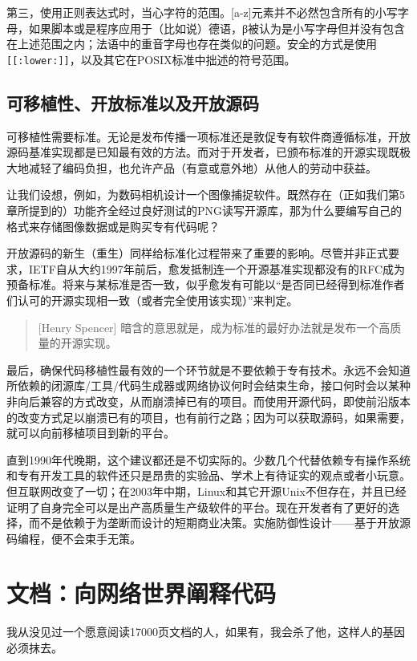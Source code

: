 \documentclass[12pt,oneside]{ctexbook}
\begin{document}
\begin{common-format}
第三，使用正则表达式时，当心字符的范围。[a-z]元素并不必然包含所有的小写字母，如果脚本或是程序应用于（比如说）德语，β被认为是小写字母但并没有包含在上述范围之内；法语中的重音字母也存在类似的问题。安全的方式是使用\verb+[[:lower:]]+，以及其它在POSIX标准中拙述的符号范围。

\section{可移植性、开放标准以及开放源码}
可移植性需要标准。无论是发布传播一项标准还是敦促专有软件商遵循标准，开放源码基准实现都是已知最有效的方法。而对于开发者，已颁布标准的开源实现既极大地减轻了编码负担，也允许产品（有意或意外地）从他人的劳动中获益。

让我们设想，例如，为数码相机设计一个图像捕捉软件。既然存在（正如我们第5章所提到的）功能齐全经过良好测试的PNG读写开源库，那为什么要编写自己的格式来存储图像数据或是购买专有代码呢？

开放源码的新生（重生）同样给标准化过程带来了重要的影响。尽管并非正式要求，IETF自从大约1997年前后，愈发抵制连一个开源基准实现都没有的RFC成为预备标准。将来与某标准是否一致，似乎愈发有可能以“是否同已经得到标准作者们认可的开源实现相一致（或者完全使用该实现）”来判定。

\begin{quote}[Henry Spencer]
暗含的意思就是，成为标准的最好办法就是发布一个高质量的开源实现。
\end{quote}

最后，确保代码移植性最有效的一个环节就是不要依赖于专有技术。永远不会知道所依赖的闭源库/工具/代码生成器或网络协议何时会结束生命，接口何时会以某种非向后兼容的方式改变，从而崩溃掉已有的项目。而使用开源代码，即使前沿版本的改变方式足以崩溃已有的项目，也有前行之路；因为可以获取源码，如果需要，就可以向前移植项目到新的平台。

直到1990年代晚期，这个建议都还是不切实际的。少数几个代替依赖专有操作系统和专有开发工具的软件还只是昂贵的实验品、学术上有待证实的观点或者小玩意。但互联网改变了一切；在2003年中期，Linux和其它开源Unix不但存在，并且已经证明了自身完全可以是出产高质量生产级软件的平台。现在开发者有了更好的选择，而不是依赖于为垄断而设计的短期商业决策。实施防御性设计——基于开放源码编程，便不会束手无策。



\chapter{文档：向网络世界阐释代码}
\begin{flushright}
\begin{notecard}{28em}
我从没见过一个愿意阅读17000页文档的人，如果有，我会杀了他，这样人的基因必须抹去。


\end{notecard}
\end{flushright}
\end{common-format}
\end{document}
